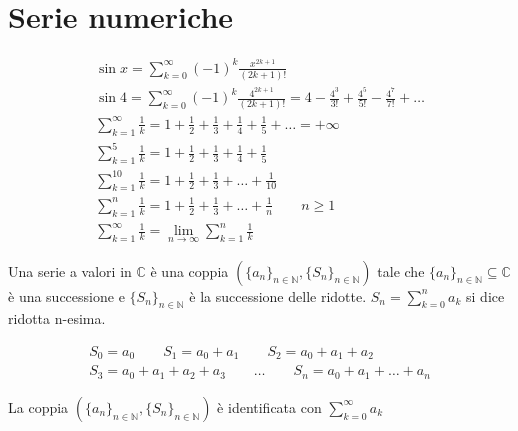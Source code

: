 \section{Serie numeriche} 

\begin{gather*}
	\sin x = \sum_{k=0}^{\infty} (-1)^{k} \frac{x^{2k+1}}{(2k+1)!}
	\\
	\sin 4 = \sum_{k=0}^{\infty} (-1)^{k} \frac{4^{2k+1}}{(2k+1)!} = 
	4 - \frac{4^3}{3!} + \frac{4^5}{5!} - \frac{4^7}{7!} + \ldots 
	\\
	\sum_{k=1}^{\infty} \frac{1}{k} = 1 + \frac{1}{2} + \frac{1}{3} + \frac{1}{4} + \frac{1}{5} + \ldots = +\infty
	\\
	\sum_{k=1}^{5} \frac{1}{k} = 1 + \frac{1}{2} + \frac{1}{3} + \frac{1}{4} + \frac{1}{5} 
	\\
	\sum_{k=1}^{10} \frac{1}{k} = 1 + \frac{1}{2} + \frac{1}{3} + \ldots + \frac{1}{10}
	\\
	\sum_{k=1}^n \frac{1}{k} = 1 + \frac{1}{2} + \frac{1}{3} + \ldots + \frac{1}{n} \qquad n \geq 1 
	\\
	\sum_{k=1}^{\infty} \frac{1}{k} = \lim_{n\rightarrow\infty} \sum_{k=1}^{n} \frac{1}{k} 
\end{gather*}


\begin{definition} 
	Una serie a valori in $\mathbb{C}$ è una coppia $(\{a_n\}_{n \in \mathbb{N}}, \{S_n\}_{n\in\mathbb{N}})$ tale che $\{a_n\}_{n\in\mathbb{N}} \subseteq \mathbb{C}$ è una successione e $\{S_n\}_{n\in\mathbb{N}}$ è la successione delle ridotte.
	$S_n=\sum_{k=0}^{n} a_k$ si dice ridotta n-esima.
\end{definition}


\begin{exbar} 
	\begin{gather*}
		S_0=a_0 \qquad S_1=a_0+a_1 \qquad	S_2=a_0+a_1+a_2 \\
		S_3=a_0+a_1+a_2+a_3 \qquad \ldots \qquad S_n=a_0+a_1+\ldots+a_n
	\end{gather*}
\end{exbar}

La coppia $(\{a_n\}_{n \in \mathbb{N}}, \{S_n\}_{n\in\mathbb{N}})$ è identificata con $\sum_{k=0}^{\infty} a_k$

